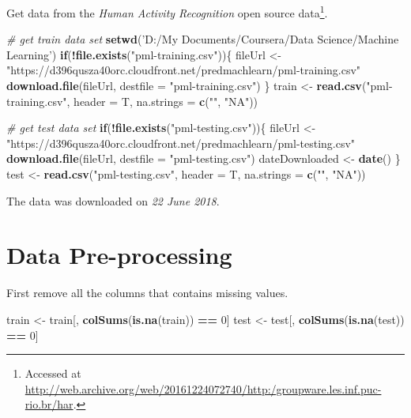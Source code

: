\documentclass[]{article}
\newenvironment{Shaded}{\begin{snugshade}}{\end{snugshade}}
\newcommand{\KeywordTok}[1]{\textcolor[rgb]{0.13,0.29,0.53}{\textbf{#1}}}
\newcommand{\DataTypeTok}[1]{\textcolor[rgb]{0.13,0.29,0.53}{#1}}
\newcommand{\DecValTok}[1]{\textcolor[rgb]{0.00,0.00,0.81}{#1}}
\newcommand{\StringTok}[1]{\textcolor[rgb]{0.31,0.60,0.02}{#1}}
\newcommand{\CommentTok}[1]{\textcolor[rgb]{0.56,0.35,0.01}{\textit{#1}}}
\newcommand{\ControlFlowTok}[1]{\textcolor[rgb]{0.13,0.29,0.53}{\textbf{#1}}}
\newcommand{\OperatorTok}[1]{\textcolor[rgb]{0.81,0.36,0.00}{\textbf{#1}}}
\newcommand{\NormalTok}[1]{#1}
\let\rmarkdownfootnote\footnote%
\def\footnote{\protect\rmarkdownfootnote}
\begin{document}
Get data from the \emph{Human Activity Recognition} open source
data\footnote{Accessed at
  \url{http://web.archive.org/web/20161224072740/http:/groupware.les.inf.puc-rio.br/har}.}.

\begin{Shaded}
\begin{Highlighting}[]
\CommentTok{# get train data set}
\KeywordTok{setwd}\NormalTok{(}\StringTok{'D:/My Documents/Coursera/Data Science/Machine Learning'}\NormalTok{)}
\ControlFlowTok{if}\NormalTok{(}\OperatorTok{!}\KeywordTok{file.exists}\NormalTok{(}\StringTok{"pml-training.csv"}\NormalTok{))\{}
\NormalTok{  fileUrl <-}\StringTok{ "https://d396qusza40orc.cloudfront.net/predmachlearn/pml-training.csv"}
  \KeywordTok{download.file}\NormalTok{(fileUrl, }\DataTypeTok{destfile =} \StringTok{"pml-training.csv"}\NormalTok{)}
\NormalTok{\}}
\NormalTok{train <-}\StringTok{ }\KeywordTok{read.csv}\NormalTok{(}\StringTok{"pml-training.csv"}\NormalTok{, }\DataTypeTok{header =}\NormalTok{ T, }\DataTypeTok{na.strings =} \KeywordTok{c}\NormalTok{(}\StringTok{""}\NormalTok{, }\StringTok{"NA"}\NormalTok{))}

\CommentTok{# get test data set}
\ControlFlowTok{if}\NormalTok{(}\OperatorTok{!}\KeywordTok{file.exists}\NormalTok{(}\StringTok{"pml-testing.csv"}\NormalTok{))\{}
\NormalTok{  fileUrl <-}\StringTok{ "https://d396qusza40orc.cloudfront.net/predmachlearn/pml-testing.csv"}
  \KeywordTok{download.file}\NormalTok{(fileUrl, }\DataTypeTok{destfile =} \StringTok{"pml-testing.csv"}\NormalTok{)}
\NormalTok{  dateDownloaded <-}\StringTok{ }\KeywordTok{date}\NormalTok{()}
\NormalTok{\}}
\NormalTok{test <-}\StringTok{ }\KeywordTok{read.csv}\NormalTok{(}\StringTok{"pml-testing.csv"}\NormalTok{, }\DataTypeTok{header =}\NormalTok{ T, }\DataTypeTok{na.strings =} \KeywordTok{c}\NormalTok{(}\StringTok{""}\NormalTok{, }\StringTok{"NA"}\NormalTok{))}
\end{Highlighting}
\end{Shaded}

The data was downloaded on \emph{22 June 2018}.

\section{Data Pre-processing}\label{data-pre-processing}

First remove all the columns that contains missing values.

\begin{Shaded}
\begin{Highlighting}[]
\NormalTok{train <-}\StringTok{ }\NormalTok{train[, }\KeywordTok{colSums}\NormalTok{(}\KeywordTok{is.na}\NormalTok{(train)) }\OperatorTok{==}\StringTok{ }\DecValTok{0}\NormalTok{]}
\NormalTok{test <-}\StringTok{ }\NormalTok{test[, }\KeywordTok{colSums}\NormalTok{(}\KeywordTok{is.na}\NormalTok{(test)) }\OperatorTok{==}\StringTok{ }\DecValTok{0}\NormalTok{]}
\end{Highlighting}
\end{Shaded}
\end{document}
